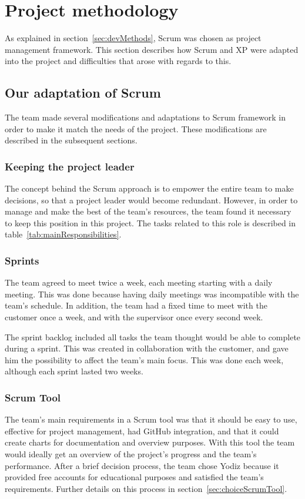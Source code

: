 \newpage
\section{Project methodology}
\label{sec:scrumDevProcess}

As explained in section~\ref{sec:devMethods}, Scrum was chosen as project management framework. 
This section describes how Scrum and XP were adapted into the project and difficulties that arose with regards to this.

\subsection{Our adaptation of Scrum}
The team made several modifications and adaptations to Scrum framework in order to make it match the needs of the project. These modifications are described in the subsequent sections.

\subsubsection{Keeping the project leader}
The concept behind the Scrum approach is to empower the entire team to make decisions, so that a project leader would become redundant. However, in order to manage and make the best of the team's resources, the team found it necessary to keep this position in this project. The tasks related to this role is described in table~\ref{tab:mainResponsibilities}.

\subsubsection{Sprints}
The team agreed to meet twice a week, each meeting starting with a daily meeting. This was done because having daily meetings was incompatible with the team's schedule. In addition, the team had a fixed time to meet with the customer once a week, and with the supervisor once every second week.

The sprint backlog included all tasks the team thought would be able to complete during a sprint. This was created in collaboration with the customer, and gave him the possibility to affect the team's main focus. This was done each week, although each sprint lasted two weeks.

\subsubsection{Scrum Tool}
\label{sec:scrumtool}
The team's main requirements in a Scrum tool was that it should be easy to use, effective for project management, had GitHub integration, and that it could create charts for documentation and overview purposes. With this tool the team would ideally get an overview of the project's progress and the team's performance. After a brief decision process, the team chose Yodiz because it provided free accounts for educational purposes and satisfied the team's requirements. Further details on this process in section~\ref{sec:choiceScrumTool}.

